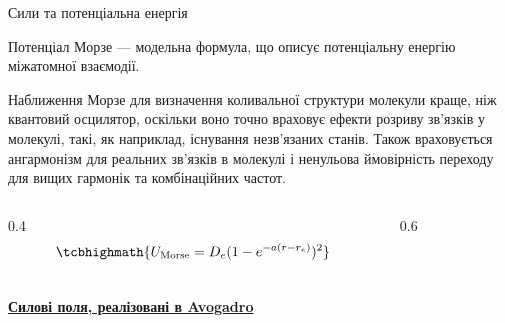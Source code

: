 \documentclass[]{beamer}
\begin{document}
\begin{frame}{Сили та потенціальна енергія}{}
\begin{overprint}
		\bigskip

		Потенціал Морзе --- модельна формула, що описує потенціальну енергію міжатомної взаємодії.

		\bigskip

		\begin{block}{}\scriptsize\justifying
			Наближення Морзе для визначення коливальної структури молекули краще, ніж квантовий осцилятор, оскільки воно точно враховує ефекти розриву зв'язків у молекулі, такі, як наприклад, існування незв'язаних станів. Також враховується ангармонізм для реальних зв'язків в молекулі і ненульова ймовірність переходу для вищих гармонік та комбінаційних частот.
		\end{block}

		\begin{columns}
			\begin{column}{0.4\linewidth}
				\begin{equation*}
					\tcbhighmath{U_\text{Morse} = D_e ( 1-e^{-a(r-r_e)} )^2}
				\end{equation*}
			\end{column}
			\begin{column}{0.6\linewidth}
				\begin{center}
				\end{center}
			\end{column}
		\end{columns}


		\framesubtitle<3>{\href{https://avogadro.cc/docs/optimizing-geometry/molecular-mechanics/}{Силові поля, реалізовані в Avogadro}}


\end{overprint}
\end{frame}
\end{document}
